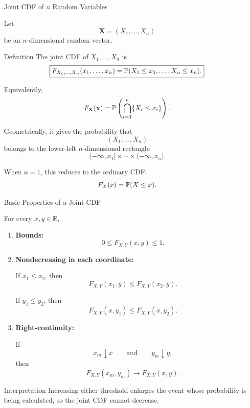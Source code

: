 \begin{frame}{Joint CDF of \(n\) Random Variables}

Let
\[
\mathbf{X}
=
(X_1,\dots,X_n)
\]
be an \(n\)-dimensional random vector.

\begin{keybox}{Definition}
The joint CDF of \(X_1,\dots,X_n\) is
\[
\boxed{
F_{X_1,\dots,X_n}(x_1,\dots,x_n)
=
\mathbb{P}(X_1\le x_1,\dots,X_n\le x_n).
}
\]
\end{keybox}

Equivalently,
\[
F_{\mathbf X}(\mathbf x)
=
\mathbb{P}\left(
\bigcap_{i=1}^{n}\{X_i\le x_i\}
\right).
\]

Geometrically, it gives the probability that
\[
(X_1,\dots,X_n)
\]
belongs to the lower-left \(n\)-dimensional rectangle
\[
(-\infty,x_1]\times\cdots\times(-\infty,x_n].
\]

When \(n=1\), this reduces to the ordinary CDF:
\[
F_X(x)=\mathbb{P}(X\le x).
\]

\end{frame}













\begin{frame}{Basic Properties of a Joint CDF}

For every \(x,y\in\mathbb{R}\),

\begin{enumerate}
    \item \textbf{Bounds:}
    \[
    \boxed{
    0\le F_{X,Y}(x,y)\le 1.
    }
    \]

    \item \textbf{Nondecreasing in each coordinate:}

    If \(x_1\le x_2\), then
    \[
    F_{X,Y}(x_1,y)
    \le
    F_{X,Y}(x_2,y).
    \]

    If \(y_1\le y_2\), then
    \[
    F_{X,Y}(x,y_1)
    \le
    F_{X,Y}(x,y_2).
    \]

    \item \textbf{Right-continuity:}

    If
    \[
    x_m\downarrow x
    \qquad\text{and}\qquad
    y_m\downarrow y,
    \]
    then
    \[
    \boxed{
    F_{X,Y}(x_m,y_m)
    \longrightarrow
    F_{X,Y}(x,y).
    }
    \]
\end{enumerate}

\begin{keybox}{Interpretation}
Increasing either threshold enlarges the event whose probability is
being calculated, so the joint CDF cannot decrease.
\end{keybox}

\end{frame}





